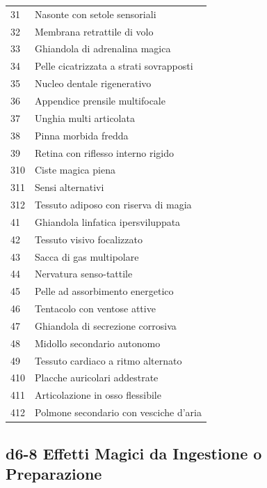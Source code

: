 \begin{multicols}{2}
\begin{tabularx}{0.50\textwidth}{lX}
	31 & Nasonte con setole sensoriali \\
	32 & Membrana retrattile di volo \\
	33 & Ghiandola di adrenalina magica \\
	34 & Pelle cicatrizzata a strati sovrapposti \\
	35 & Nucleo dentale rigenerativo \\
	36 & Appendice prensile multifocale \\
	37 & Unghia multi articolata \\
	38 & Pinna morbida fredda \\
	39 & Retina con riflesso interno rigido \\
	310 & Ciste magica piena \\
	311 & Sensi alternativi \\
	312 & Tessuto adiposo con riserva di magia \\

	41 & Ghiandola linfatica ipersviluppata \\
	42 & Tessuto visivo focalizzato \\
	43 & Sacca di gas multipolare \\
	44 & Nervatura senso-tattile \\
	45 & Pelle ad assorbimento energetico \\
	46 & Tentacolo con ventose attive \\
	47 & Ghiandola di secrezione corrosiva \\
	48 & Midollo secondario autonomo \\
	49 & Tessuto cardiaco a ritmo alternato \\
	410 & Placche auricolari addestrate \\
	411 & Articolazione in osso flessibile \\
	412 & Polmone secondario con vesciche d’aria \\

\end{tabularx}

\subsection*{d6-8 Effetti Magici da Ingestione o Preparazione}


\end{multicols}
